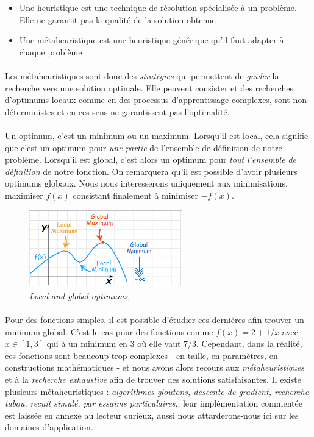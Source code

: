 \begin{itemize}
    \item Une heuristique est une technique de résolution spécialisée à un problème. Elle ne garantit pas la qualité de
    la solution obtenue
    \item Une métaheuristique est une heuristique générique qu’il faut adapter à chaque problème
\end{itemize}

\paragraph{} Les métaheuristiques sont donc des \emph{stratégies} qui permettent de \emph{guider} la recherche vers une
solution optimale. Elle peuvent consister et des recherches d'optimums locaux comme en des processus d'apprentissage complexes,
sont non-déterministes et en ces sens ne garantissent pas l'optimalité.

\paragraph{} Un optimum, c'est un minimum ou un maximum. Lorsqu'il est local, cela signifie que c'est un optimum pour \emph{une
partie} de l'ensemble de définition de notre problème. Lorsqu'il est global, c'est alors un optimum pour \emph{tout l'ensemble
de définition} de notre fonction. On remarquera qu'il est possible d'avoir plusieurs optimums globaux. Nous nous interesserons 
uniquement aux minimisations, maximiser $f(x)$ consistant finalement à minimiser $-f(x)$.

\begin{figure}[h]
    \centering
    \includegraphics[width=250px]{chapters/03/images/optimums.png}
    \caption{\label{comparatif} \emph{Local and global optimums}, \cite{Optimums0}}
\end{figure}

\paragraph{} Pour des fonctions simples, il est possible d'étudier ces dernières afin trouver un minimum global.
C'est le cas pour des fonctions comme $f(x) = 2 + 1/x$ avec $x \in [1, 3]$ qui à un minimum en 3 où elle vaut $7/3$.
Cependant, dans la réalité, ces fonctions sont beaucoup trop complexes - en taille, en paramètres, en constructions
mathématiques - et nous avons alors recours aux \emph{métaheuristiques} et à la \emph{recherche exhaustive} afin
de trouver des solutions satisfaisantes. Il existe plusieurs métaheuristiques : \emph{algorithmes gloutons, descente
de gradient, recherche tabou, recuit simulé, par essaims particulaires}.. leur implémentation commentée est laissée
en annexe au lecteur curieux, aussi nous attarderons-nous ici sur les domaines d'application.

